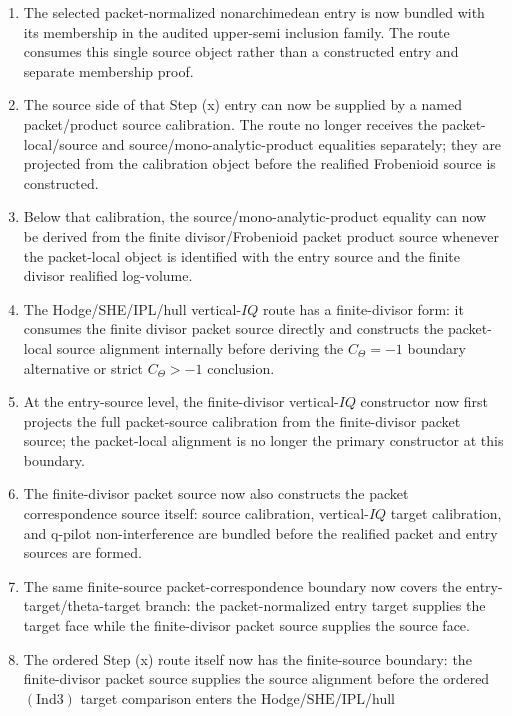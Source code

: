 \documentclass[11pt]{article}
\newcommand{\Ind}{\ensuremath{\mathrm{Ind}}}
\newcommand{\SHE}{\ensuremath{\mathrm{SHE}}}
\newcommand{\IPL}{\ensuremath{\mathrm{IPL}}}
\theoremstyle{plain}
\theoremstyle{definition}
\theoremstyle{remark}
\begin{document}
\begin{enumerate}
  as a Step (x) theta-source alignment, and the Hodge/SHE/IPL/hull endpoint
  consumes that aligned object instead of separate route/equality inputs.
\item The selected packet-normalized nonarchimedean entry is now bundled with
  its membership in the audited upper-semi inclusion family.  The route consumes
  this single source object rather than a constructed entry and separate
  membership proof.
\item The source side of that Step (x) entry can now be supplied by a named
  packet/product source calibration.  The route no longer receives the
  packet-local/source and source/mono-analytic-product equalities separately;
  they are projected from the calibration object before the realified
  Frobenioid source is constructed.
\item Below that calibration, the source/mono-analytic-product equality can now
  be derived from the finite divisor/Frobenioid packet product source whenever
  the packet-local object is identified with the entry source and the finite
  divisor realified log-volume.
\item The Hodge/SHE/IPL/hull vertical-\(IQ\) route has a finite-divisor form:
  it consumes the finite divisor packet source directly and constructs the
  packet-local source alignment internally before deriving the
  \(C_\Theta=-1\) boundary alternative or strict \(C_\Theta>-1\) conclusion.
\item At the entry-source level, the finite-divisor vertical-\(IQ\) constructor
  now first projects the full packet-source calibration from the finite-divisor
  packet source; the packet-local alignment is no longer the primary
  constructor at this boundary.
\item The finite-divisor packet source now also constructs the packet
  correspondence source itself: source calibration, vertical-\(IQ\) target
  calibration, and q-pilot non-interference are bundled before the realified
  packet and entry sources are formed.
\item The same finite-source packet-correspondence boundary now covers the
  entry-target/theta-target branch: the packet-normalized entry target supplies
  the target face while the finite-divisor packet source supplies the source
  face.
\item The ordered Step (x) route itself now has the finite-source boundary:
  the finite-divisor packet source supplies the source alignment before the
  ordered \((\Ind3)\) target comparison enters the Hodge/\(\SHE/\IPL\)/hull

\end{enumerate}
\end{document}
